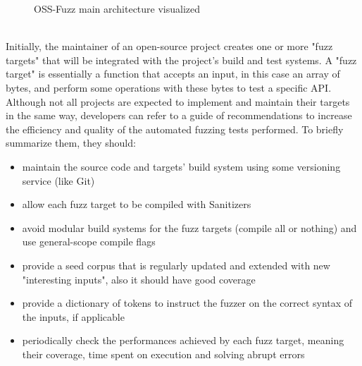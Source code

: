 \newpage
\begin{figure}[h]
\caption{OSS-Fuzz main architecture visualized \cite{ossfuzz_docs}}
\label{fig:ossfuzz_architecture}
\end{figure}
\ \\
Initially, the maintainer of an open-source project creates one or more "fuzz targets" that will be integrated with the project's build and test systems. \cite{libfuzzer_docs}
\newline
A "fuzz target" is essentially a function that accepts an input, in this case an array of bytes, and perform some operations with these bytes to test a specific API.
\newline
Although not all projects are expected to implement and maintain their targets in the same way, developers can refer to a guide of recommendations to increase the efficiency and quality of the automated fuzzing tests performed.
\newline \newline
To briefly summarize them, they should:
\begin{itemize}
    \item maintain the source code and targets' build system using some versioning service (like Git)
    \item allow each fuzz target to be compiled with Sanitizers
    \item avoid modular build systems for the fuzz targets (compile all or nothing) and use general-scope compile flags
    \item provide a seed corpus that is regularly updated and extended with new "interesting inputs", also it should have good coverage
    \item provide a dictionary of tokens to instruct the fuzzer on the correct syntax of the inputs, if applicable
    \item periodically check the performances achieved by each fuzz target, meaning their coverage, time spent on execution and solving abrupt errors
\end{itemize}


